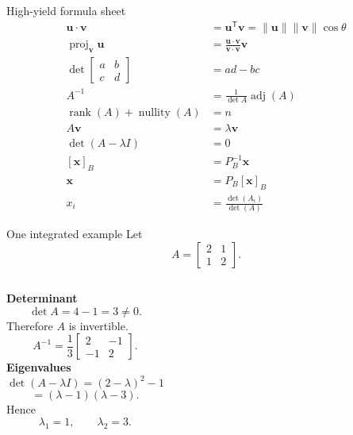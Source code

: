 \documentclass[aspectratio=169,11pt]{beamer}
\newcommand{\vect}[1]{\bm{#1}}
\newcommand{\T}{^{\mathsf T}}
\begin{document}
\begin{frame}{High-yield formula sheet}
\small
\begin{align*}
\vect u\cdot\vect v&=\vect u\T\vect v
=\|\vect u\|\|\vect v\|\cos\theta\\
\operatorname{proj}_{\vect v}\vect u
&=\frac{\vect u\cdot\vect v}{\vect v\cdot\vect v}\vect v\\
\det\begin{bmatrix}a&b\\c&d\end{bmatrix}&=ad-bc\\
A^{-1}&=\frac{1}{\det A}\operatorname{adj}(A)\\
\operatorname{rank}(A)+\operatorname{nullity}(A)&=n\\
A\vect v&=\lambda\vect v\\
\det(A-\lambda I)&=0\\
[\vect x]_B&=P_B^{-1}\vect x\\
\vect x&=P_B[\vect x]_B\\
x_i&=\frac{\det(A_i)}{\det(A)}
\end{align*}
\end{frame}




\begin{frame}{One integrated example}
Let
\[
A=
\begin{bmatrix}
2&1\\
1&2
\end{bmatrix}.
\]
\begin{columns}[T]
\textbf{Determinant}
\[
\det A=4-1=3\neq0.
\]
Therefore $A$ is invertible.
\[
A^{-1}=\frac13
\begin{bmatrix}
2&-1\\-1&2
\end{bmatrix}.
\]
\textbf{Eigenvalues}
\[
\det(A-\lambda I)
=(2-\lambda)^2-1
\]
\[
=(\lambda-1)(\lambda-3).
\]
Hence
\[
\lambda_1=1,\qquad\lambda_2=3.
\]
\end{columns}
\end{frame}
\end{document}
